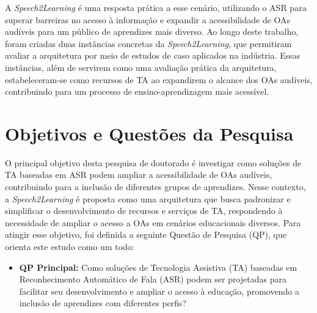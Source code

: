 A \textit{Speech2Learning} é uma resposta prática a esse cenário, utilizando o ASR para superar barreiras no acesso à informação e expandir a acessibilidade de OAs audíveis para um público de aprendizes mais diverso. Ao longo deste trabalho, foram criadas duas instâncias concretas da \textit{Speech2Learning}, que permitiram avaliar a arquitetura por meio de estudos de caso aplicados na indústria. Essas instâncias, além de servirem como uma avaliação prática da arquitetura, estabeleceram-se como recursos de TA ao expandirem o alcance dos OAs audíveis, contribuindo para um processo de ensino-aprendizagem mais acessível.

\section{Objetivos e Questões da Pesquisa}
\label{chapter1:research-questions}

O principal objetivo desta pesquisa de doutorado é investigar como soluções de TA baseadas em ASR podem ampliar a acessibilidade de OAs audíveis, contribuindo para a inclusão de diferentes grupos de aprendizes. Nesse contexto, a \textit{Speech2Learning} é proposta como uma arquitetura que busca padronizar e simplificar o desenvolvimento de recursos e serviços de TA, respondendo à necessidade de ampliar o acesso a OAs em cenários educacionais diversos. Para atingir esse objetivo, foi definida a seguinte Questão de Pesquisa (QP), que orienta este estudo como um todo:

\begin{itemize}
\item \textbf{QP Principal:} Como soluções de Tecnologia Assistiva (TA) baseadas em Reconhecimento Automático de Fala (ASR) podem ser projetadas para facilitar seu desenvolvimento e ampliar o acesso à educação, promovendo a inclusão de aprendizes com diferentes perfis?
\end{itemize}

